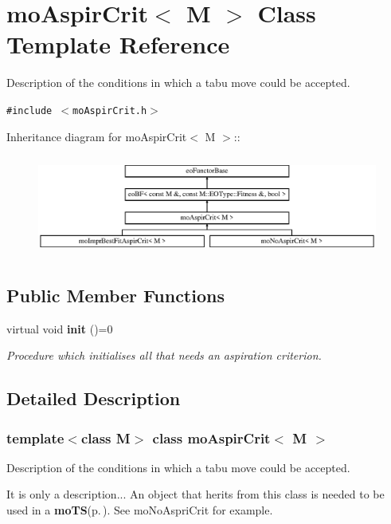 \section{mo\-Aspir\-Crit$<$ M $>$ Class Template Reference}
\label{classmo_aspir_crit}
Description of the conditions in which a tabu move could be accepted.  


{\tt \#include $<$mo\-Aspir\-Crit.h$>$}

Inheritance diagram for mo\-Aspir\-Crit$<$ M $>$::\begin{figure}[H]
\begin{center}
\leavevmode
\includegraphics[height=3.35329cm]{classmo_aspir_crit}
\end{center}
\end{figure}
\subsection*{Public Member Functions}
\begin{CompactItemize}
\item 
virtual void {\bf init} ()=0
\begin{CompactList}\small\item\em Procedure which initialises all that needs an aspiration criterion. \item\end{CompactList}\end{CompactItemize}


\subsection{Detailed Description}
\subsubsection*{template$<$class M$>$ class mo\-Aspir\-Crit$<$ M $>$}

Description of the conditions in which a tabu move could be accepted. 

It is only a description... An object that herits from this class is needed to be used in a {\bf mo\-TS}{\rm (p.\,\pageref{classmo_t_s})}. See mo\-No\-Aspri\-Crit for example. 



